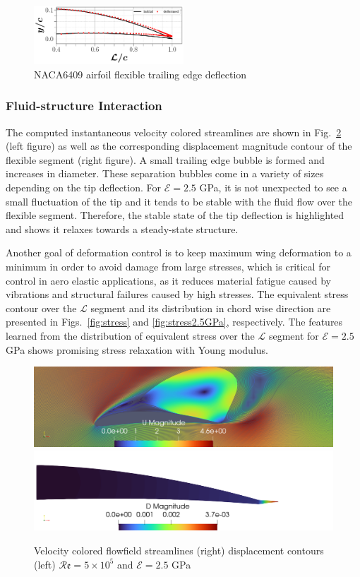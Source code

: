 \documentclass[conf]{new-aiaa}
\newcommand{\Rey}{\mathcal{R}\mathfrak{e}}
\begin{document}
%
\begin{figure}[ht!]
\centering
\includegraphics[width=0.50\textwidth]{figs/naca6409_deformed.pdf}
\caption{NACA6409 airfoil flexible trailing edge deflection}
\label{fig:airfoilSegments} 
\end{figure}
\subsubsection{Fluid-structure Interaction}
\label{sec:fluidStrucutreRespnseToYoungAndRey}

The computed instantaneous velocity colored streamlines are shown in Fig.~\ref{fig:25GPA} (left figure)  as well as the corresponding displacement magnitude contour of the flexible segment (right figure).
%
A small trailing edge bubble is formed and increases in diameter.
%
These separation bubbles come in a variety of sizes depending on the tip deflection.
%
For $\mathcal{E}=2.5$ GPa, it is not unexpected to see a small fluctuation of the tip and it tends to be stable with the fluid flow over the flexible segment. Therefore, the stable state of the tip deflection is highlighted and shows it relaxes towards a steady-state structure.

Another goal of deformation control is to keep maximum wing deformation to a minimum in order to avoid damage from large stresses, which is critical for control in aero elastic applications, as it reduces material fatigue caused by vibrations and structural failures caused by high stresses.
%
The equivalent stress contour over the $\mathcal{L}$ segment and its distribution in chord wise direction are presented in Figs.~\ref{fig:stress} and \ref{fig:stress2.5GPa}, respectively.
%
The features learned from the distribution of equivalent stress over the $\mathcal{L}$ segment for $\mathcal{E}=2.5$ GPa shows promising stress relaxation with Young modulus.
%
%
\begin{figure}[ht!]
\centering
\includegraphics[width=0.45\columnwidth]{Figures/streamLines25GPACoupling.png}
\includegraphics[width=0.45\columnwidth]{Figures/DMAgnitude25GPaCoupling.png}
\caption{Velocity colored flowfield streamlines (right) displacement contours (left) $\Rey=5\times10^5$ and $\mathcal{E}=2.5$ GPa}
\label{fig:25GPA}
\end{figure}
\end{document}
